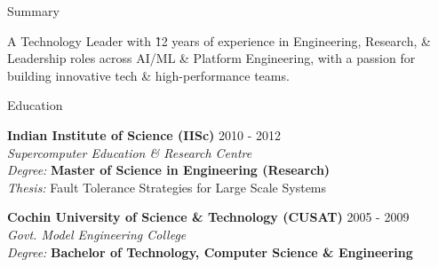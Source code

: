 \documentclass{resume} %
\begin{document}

\begin{rSection}{Summary}

A Technology Leader with \~12 years of experience in Engineering, Research, \& Leadership roles across AI/ML \& Platform Engineering, with a passion for building innovative tech \& high-performance teams. 

\end{rSection}


\begin{rSection}{Education}

{\bf Indian Institute of Science (IISc)} \hfill {2010 - 2012} \\ 
{\em Supercomputer Education \& Research Centre} \smallskip \\
{\em Degree:} {\bf Master of Science in Engineering (Research)} \\
{\em Thesis:} Fault Tolerance Strategies for Large Scale Systems

{\bf Cochin University of Science \& Technology (CUSAT)} \hfill {2005 - 2009} \\
{\em Govt. Model Engineering College} \smallskip \\
{\em Degree:} {\bf Bachelor of Technology, Computer Science \& Engineering}

\end{rSection}

\end{document}
